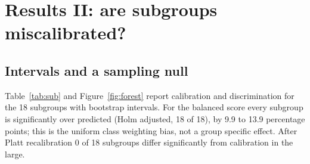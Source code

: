 \documentclass[11pt,a4paper]{article}
\begin{document}
\section{Results II: are subgroups miscalibrated?}\label{sec:subgroup}
\subsection{Intervals and a sampling null}
Table~\ref{tab:sub} and Figure~\ref{fig:forest} report calibration and discrimination for the 18 subgroups with bootstrap intervals. For the balanced score every subgroup is significantly over predicted (Holm adjusted, 18 of 18), by 9.9 to 13.9 percentage points; this is the uniform class weighting bias, not a group specific effect. After Platt recalibration 0 of 18 subgroups differ significantly from calibration in the large.
\end{document}
